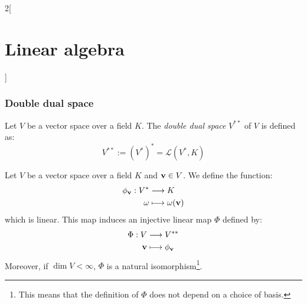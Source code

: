 \documentclass[../../../main.tex]{subfiles}
\begin{document}
\begin{multicols}{2}[\section{Linear algebra}]
  \subsubsection{Double dual space}
  \begin{definition}
    Let $V$ be a vector space over a field $K$. The \emph{double dual space} $V^{**}$ of $V$ is defined as: $$V^{**}:={(V^*)}^*=\mathcal{L}(V^*,K)$$
  \end{definition}
  \begin{prop}
    Let $V$ be a vector space over a field $K$ and $\boldsymbol{\mathrm{v}}\in V$. We define the function:
    \begin{align*}
      \phi_{\boldsymbol{\mathrm{v}}}:V^* & \longrightarrow K                     \\
      \omega                        & \longmapsto\omega(\boldsymbol{\mathrm{v}})
    \end{align*}
    which is linear. This map induces an injective linear map $\Phi$ defined by:
    \begin{align*}
      \Phi:V             & \longrightarrow V^{**}               \\
      \boldsymbol{\mathrm{v}} & \longmapsto\phi_{\boldsymbol{\mathrm{v}}}
    \end{align*}
    Moreover, if $\dim V<\infty$, $\Phi$ is a natural isomorphism\footnote{This means that the definition of $\Phi$ does not depend on a choice of basis.}.
  \end{prop}

\end{multicols}
\end{document}
